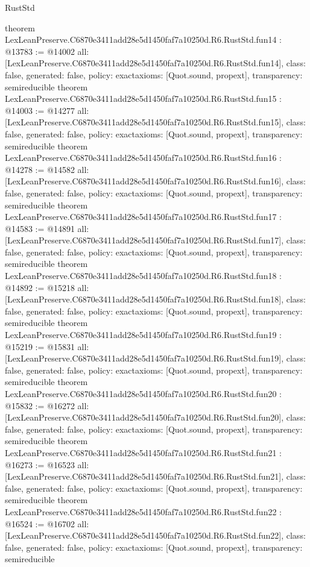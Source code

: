\begin{lexlean}{RustStd}
\begin{coremodule}
{}
theorem LexLeanPreserve.C6870e3411add28e5d1450faf7a10250d.R6.RustStd.fun14 : @13783 := @14002 {
  all: [LexLeanPreserve.C6870e3411add28e5d1450faf7a10250d.R6.RustStd.fun14],
  class: false,
  generated: false,
  policy: exact{axioms: [Quot.sound, propext]},
  transparency: semireducible
}
theorem LexLeanPreserve.C6870e3411add28e5d1450faf7a10250d.R6.RustStd.fun15 : @14003 := @14277 {
  all: [LexLeanPreserve.C6870e3411add28e5d1450faf7a10250d.R6.RustStd.fun15],
  class: false,
  generated: false,
  policy: exact{axioms: [Quot.sound, propext]},
  transparency: semireducible
}
theorem LexLeanPreserve.C6870e3411add28e5d1450faf7a10250d.R6.RustStd.fun16 : @14278 := @14582 {
  all: [LexLeanPreserve.C6870e3411add28e5d1450faf7a10250d.R6.RustStd.fun16],
  class: false,
  generated: false,
  policy: exact{axioms: [Quot.sound, propext]},
  transparency: semireducible
}
theorem LexLeanPreserve.C6870e3411add28e5d1450faf7a10250d.R6.RustStd.fun17 : @14583 := @14891 {
  all: [LexLeanPreserve.C6870e3411add28e5d1450faf7a10250d.R6.RustStd.fun17],
  class: false,
  generated: false,
  policy: exact{axioms: [Quot.sound, propext]},
  transparency: semireducible
}
theorem LexLeanPreserve.C6870e3411add28e5d1450faf7a10250d.R6.RustStd.fun18 : @14892 := @15218 {
  all: [LexLeanPreserve.C6870e3411add28e5d1450faf7a10250d.R6.RustStd.fun18],
  class: false,
  generated: false,
  policy: exact{axioms: [Quot.sound, propext]},
  transparency: semireducible
}
theorem LexLeanPreserve.C6870e3411add28e5d1450faf7a10250d.R6.RustStd.fun19 : @15219 := @15831 {
  all: [LexLeanPreserve.C6870e3411add28e5d1450faf7a10250d.R6.RustStd.fun19],
  class: false,
  generated: false,
  policy: exact{axioms: [Quot.sound, propext]},
  transparency: semireducible
}
theorem LexLeanPreserve.C6870e3411add28e5d1450faf7a10250d.R6.RustStd.fun20 : @15832 := @16272 {
  all: [LexLeanPreserve.C6870e3411add28e5d1450faf7a10250d.R6.RustStd.fun20],
  class: false,
  generated: false,
  policy: exact{axioms: [Quot.sound, propext]},
  transparency: semireducible
}
theorem LexLeanPreserve.C6870e3411add28e5d1450faf7a10250d.R6.RustStd.fun21 : @16273 := @16523 {
  all: [LexLeanPreserve.C6870e3411add28e5d1450faf7a10250d.R6.RustStd.fun21],
  class: false,
  generated: false,
  policy: exact{axioms: [Quot.sound, propext]},
  transparency: semireducible
}
theorem LexLeanPreserve.C6870e3411add28e5d1450faf7a10250d.R6.RustStd.fun22 : @16524 := @16702 {
  all: [LexLeanPreserve.C6870e3411add28e5d1450faf7a10250d.R6.RustStd.fun22],
  class: false,
  generated: false,
  policy: exact{axioms: [Quot.sound, propext]},
  transparency: semireducible
}
\end{coremodule}
\end{lexlean}
